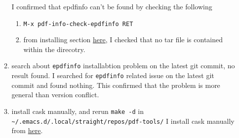 \documentclass[11pt]{article}
\begin{document}
\begin{enumerate}
\begin{enumerate}
I confirmed that epdfinfo can't be found by checking the following
\begin{enumerate}
\item \texttt{M-x pdf-info-check-epdfinfo RET}
\item from installing section \href{https://github.com/vedang/pdf-tools/tree/a8847b75d3487d60e27762816bdbdd23b6dc1c11\#installing}{here}, I checked that no tar file is contained within the direcotry.
\end{enumerate}
\item search about \texttt{epdfinfo} installabtion problem on the latest git commit, no result found.
\label{sec:orgd990a4a}
I searched for \texttt{epdfinfo} related issue on the latest git commit and found nothing.
This confirmed that the problem is more general than version conflict.
\item install cask manually, and rerun \texttt{make -d} in \texttt{\textasciitilde{}/.emacs.d/.local/straight/repos/pdf-tools/}
\label{sec:org0e84d7d}
I install cask manually from \href{https://github.com/cask/cask\#installation}{here}.


\end{enumerate}
\end{enumerate}
\end{document}

